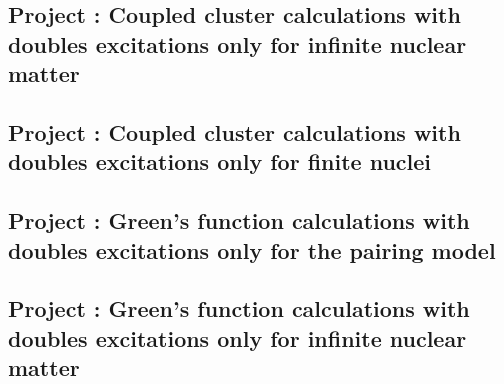 \documentclass[%
twoside,                 %
final,                   %
10pt]{article}
\newenvironment{doconceexercise}{}{}
\newcounter{doconceexercisecounter}
\begin{document}
\begin{doconceexercise}

\subsection*{Project \thedoconceexercisecounter: Coupled cluster calculations with doubles excitations only for infinite nuclear matter}


\end{doconceexercise}




\begin{doconceexercise}

\subsection*{Project \thedoconceexercisecounter: Coupled cluster calculations with doubles excitations only for finite nuclei}


\end{doconceexercise}




\begin{doconceexercise}

\subsection*{Project \thedoconceexercisecounter: Green's function calculations with doubles excitations only for the pairing model}


\end{doconceexercise}




\begin{doconceexercise}

\subsection*{Project \thedoconceexercisecounter: Green's function calculations with doubles excitations only for infinite nuclear matter}


\end{doconceexercise}
\end{document}
